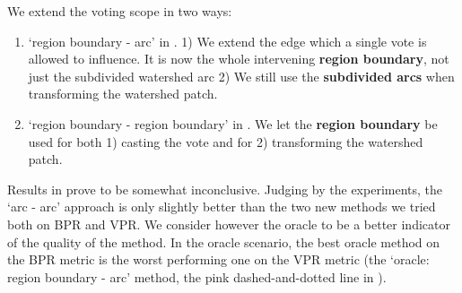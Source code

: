 %
% 
% 
% 


We extend the voting scope in two ways:
\begin{enumerate}
 \item{`region boundary - arc'} in . 
 1) We extend the 
 edge which a single vote is allowed to influence. It is now the whole intervening {\bf region boundary}, not just the subdivided watershed arc 
 2) We 
 still use the {\bf subdivided arcs} when transforming the watershed patch. 
 \item{`region boundary - region boundary'} in . We let the {\bf region boundary} be used for both 1) casting the vote and for 2) transforming the watershed patch.
\end{enumerate}


Results in  prove to be somewhat inconclusive. %
Judging by the experiments, the `arc - arc' approach is only slightly %
better than the two new methods we tried both on BPR and VPR. We consider however the oracle to be a better indicator of the quality of the method. In the oracle scenario, the best oracle method on the BPR metric is the worst performing one on the VPR metric (the `oracle: region boundary - arc' method, the pink dashed-and-dotted line in %
).

